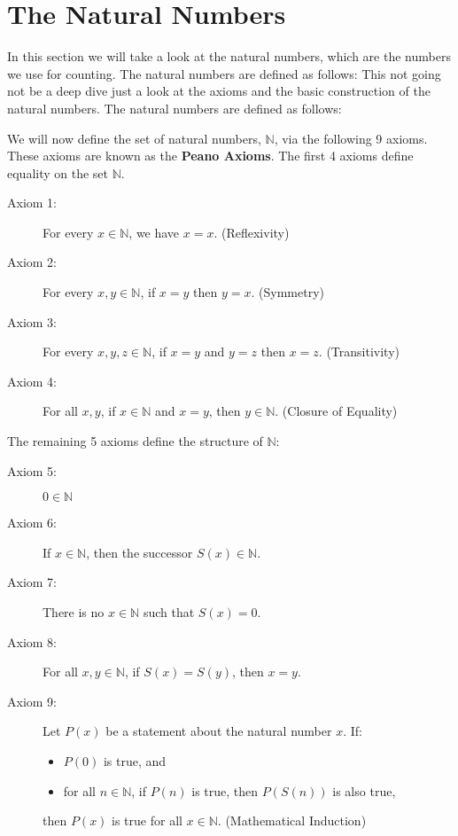 \section{The Natural Numbers}
In this section we will take a look at the natural numbers, which are the numbers we use for counting. The natural numbers are defined as follows:
This not going not be a deep dive just a look at the axioms and the basic construction of the natural numbers. The natural numbers are defined as follows:

We will now define the set of natural numbers, \( \mathbb{N} \), via the following 9 axioms. These axioms are known as the \textbf{Peano Axioms}. The first 4 axioms define equality on the set \( \mathbb{N} \).

\begin{description}
  \item[Axiom 1:] For every \( x \in \mathbb{N} \), we have \( x = x \). \hfill (Reflexivity)
  \item[Axiom 2:] For every \( x, y \in \mathbb{N} \), if \( x = y \) then \( y = x \). \hfill (Symmetry)
  \item[Axiom 3:] For every \( x, y, z \in \mathbb{N} \), if \( x = y \) and \( y = z \) then \( x = z \). \hfill (Transitivity)
  \item[Axiom 4:] For all \( x, y \), if \( x \in \mathbb{N} \) and \( x = y \), then \( y \in \mathbb{N} \). \hfill (Closure of Equality)
\end{description}

The remaining 5 axioms define the structure of \( \mathbb{N} \):

\begin{description}
  \item[Axiom 5:] \( 0 \in \mathbb{N} \)
  \item[Axiom 6:] If \( x \in \mathbb{N} \), then the successor \( S(x) \in \mathbb{N} \).
  \item[Axiom 7:] There is no \( x \in \mathbb{N} \) such that \( S(x) = 0 \).
  \item[Axiom 8:] For all \( x, y \in \mathbb{N} \), if \( S(x) = S(y) \), then \( x = y \).
  \item[Axiom 9:] Let \( P(x) \) be a statement about the natural number \( x \). If:
    \begin{itemize}
        \item \( P(0) \) is true, and
        \item for all \( n \in \mathbb{N} \), if \( P(n) \) is true, then \( P(S(n)) \) is also true,
    \end{itemize}
    then \( P(x) \) is true for all \( x \in \mathbb{N} \). \hfill (Mathematical Induction)
\end{description}

